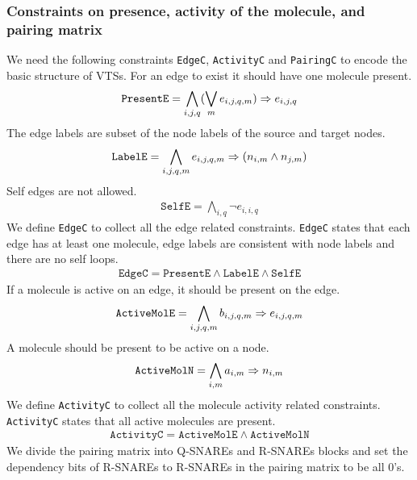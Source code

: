 \subsubsection{Constraints on presence, activity of the molecule, and pairing matrix}
%
We need the following constraints \texttt{EdgeC},
\texttt{ActivityC} and \texttt{PairingC} to encode the basic structure of VTSs.
%
For an edge to exist it should have one molecule present. 
%
\begin{align*}
  \texttt{PresentE} = \bigwedge\limits_{i,j,q} (\bigvee_m e_{i,j,q,m} )\Rightarrow e_{i,j,q}
\end{align*}
The edge labels are subset of the node labels of the source and target nodes.
\begin{align*}
  \texttt{LabelE} = \bigwedge\limits_{i,j,q,m} e_{i,j,q,m} \Rightarrow (n_{i,m} \land n_{j,m} )
\end{align*}
Self edges are not allowed. 
\begin{align*}
  \texttt{SelfE} = \bigwedge\limits_{i,q} \neg e_{i,i,q}
\end{align*}
\noindent We define \texttt{EdgeC} to collect all the edge related constraints. 
%
\texttt{EdgeC} states that each edge has at least one molecule,
 edge labels are consistent with node labels and there are no self loops.    
\begin{align*}
  \texttt{EdgeC} = \texttt{PresentE} \land \texttt{LabelE}  \land \texttt{SelfE} 
\end{align*}
\noindent If a molecule is active on an edge, it should be present on the edge.
%
\begin{align*}
  \texttt{ActiveMolE} = \bigwedge\limits_{i,j,q,m} b_{i,j,q,m} \Rightarrow e_{i,j,q,m}\label{eq:f1}
\end{align*}
A molecule should be present to be active on a node.  
\begin{align*}
    \texttt{ActiveMolN} = \bigwedge\limits_{i,m} a_{i,m} \Rightarrow n_{i,m}
\end{align*}
\noindent We define \texttt{ActivityC} to collect all the molecule activity related constraints. 
\texttt{ActivityC} states that all active molecules are present.
\begin{align*}
  \texttt{ActivityC} = \texttt{ActiveMolE} \land \texttt{ActiveMolN} 
\end{align*}
\noindent We divide the pairing matrix into Q-SNAREs and R-SNAREs blocks and set the dependency bits of R-SNAREs to R-SNAREs in the pairing matrix to be all 0's.

